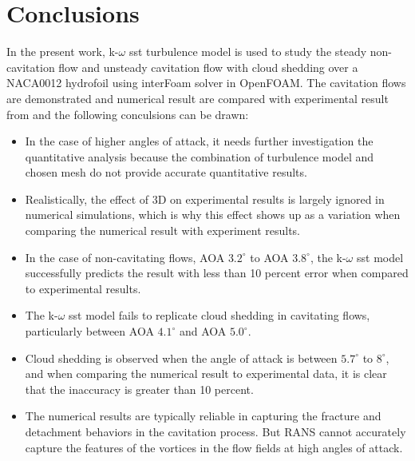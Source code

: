 \chapter{Conclusions}
In the present work, k-$\omega$ sst turbulence model is used to study the steady non-cavitation flow  and 
unsteady cavitation flow with cloud shedding over a  NACA0012 hydrofoil using interFoam solver in OpenFOAM.
The cavitation flows are demonstrated and numerical result are compared with experimental result from \cite{Zhao2021}
and the following conculsions can be drawn:
\begin{itemize}
\item In the case of higher angles of attack, it needs further investigation the quantitative analysis because 
the combination of turbulence model and chosen mesh do not provide accurate quantitative results.
\item Realistically, the effect of 3D on experimental results is largely ignored in numerical simulations, 
which is why this effect shows up as a variation when comparing the numerical result with experiment results.
\item In the case of non-cavitating flows, AOA $3.2^{\circ}$ to AOA $3.8^{\circ}$, the k-$\omega$ sst model
 successfully predicts the result with less than 10 percent error when compared to experimental results. 
\item The k-$\omega$ sst model fails to replicate cloud shedding in cavitating flows, particularly between AOA $4.1^{\circ}$ and AOA $5.0^{\circ}$. 
\item Cloud shedding is observed when the angle of attack is between $5.7^{\circ}$ to $8^{\circ}$, and 
when comparing the numerical result to experimental data, it is clear that the inaccuracy is greater than 10 percent.  
\item The numerical results are typically reliable in capturing the fracture and detachment behaviors in the cavitation process. 
But RANS cannot accurately capture the features of the vortices in the flow fields at high angles of attack. 
\end{itemize}

































